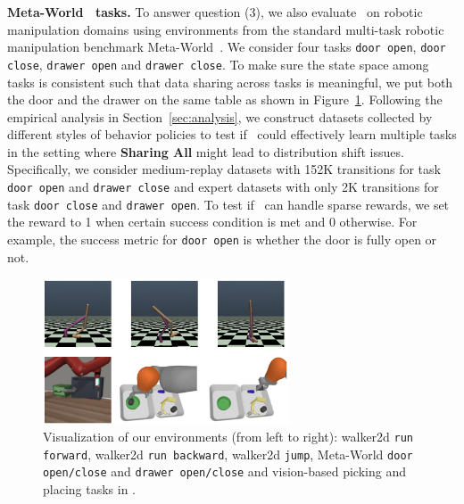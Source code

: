 \textbf{Meta-World~\citep{yu2020metaworld} tasks.} To answer question (3), we also evaluate \methodname\ on robotic manipulation domains using environments from the standard multi-task robotic manipulation benchmark Meta-World~\citep{yu2020metaworld}. We consider four tasks \texttt{door open}, \texttt{door close}, \texttt{drawer open} and \texttt{drawer close}. To make sure the state space among tasks is consistent such that data sharing across tasks is meaningful, we put both the door and the drawer on the same table as shown in Figure~\ref{fig:env}. Following the empirical analysis in Section~\ref{sec:analysis}, we construct datasets collected by different styles of behavior policies to test if \methodname\ could effectively learn multiple tasks in the setting where \textbf{Sharing All} might lead to distribution shift issues. Specifically, we consider medium-replay datasets with 152K transitions for task \texttt{door open} and \texttt{drawer close} and expert datasets with only 2K transitions for task \texttt{door close} and \texttt{drawer open}. To test if \methodname\ can handle sparse rewards, we set the reward to 1 when certain success condition is met and 0 otherwise. For example, the success metric for \texttt{door open} is whether the door is fully open or not.

\begin{figure}
    \vspace{-0.4cm}
    \centering
    \includegraphics[width=0.65\textwidth]{chapters/cds/env.png}
    \vspace{-0.2cm}
    \caption{\footnotesize Visualization of our environments (from left to right): walker2d \texttt{run forward}, walker2d \texttt{run backward}, walker2d \texttt{jump},  Meta-World \texttt{door open/close} and \texttt{drawer open/close} and vision-based picking and placing tasks in \citep{kalashnikov2021mt}.}
    \label{fig:env}
    \vspace{-0.3cm}
\end{figure}

